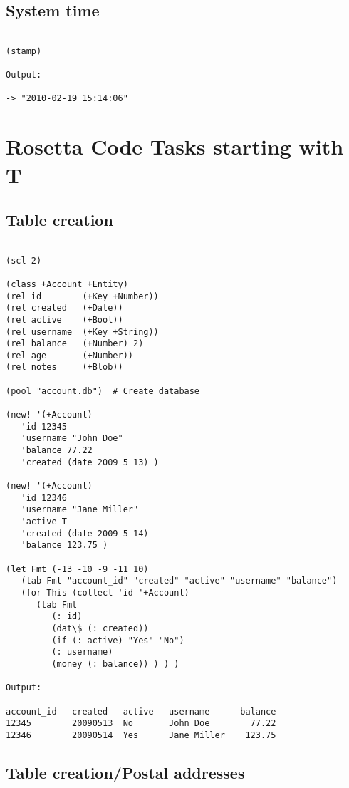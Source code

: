 \section*{System time}

\begin{verbatim}

(stamp)

Output:

-> "2010-02-19 15:14:06"

\end{verbatim}

\chapter{Rosetta Code Tasks starting with T}

\section*{Table creation}

\begin{verbatim}

(scl 2)

(class +Account +Entity)
(rel id        (+Key +Number))
(rel created   (+Date))
(rel active    (+Bool))
(rel username  (+Key +String))
(rel balance   (+Number) 2)
(rel age       (+Number))
(rel notes     (+Blob))

(pool "account.db")  # Create database

(new! '(+Account)
   'id 12345
   'username "John Doe"
   'balance 77.22
   'created (date 2009 5 13) )

(new! '(+Account)
   'id 12346
   'username "Jane Miller"
   'active T
   'created (date 2009 5 14)
   'balance 123.75 )

(let Fmt (-13 -10 -9 -11 10)
   (tab Fmt "account_id" "created" "active" "username" "balance")
   (for This (collect 'id '+Account)
      (tab Fmt
         (: id)
         (dat\$ (: created))
         (if (: active) "Yes" "No")
         (: username)
         (money (: balance)) ) ) )

Output:

account_id   created   active   username      balance
12345        20090513  No       John Doe        77.22
12346        20090514  Yes      Jane Miller    123.75

\end{verbatim}

\section*{Table creation/Postal addresses}

